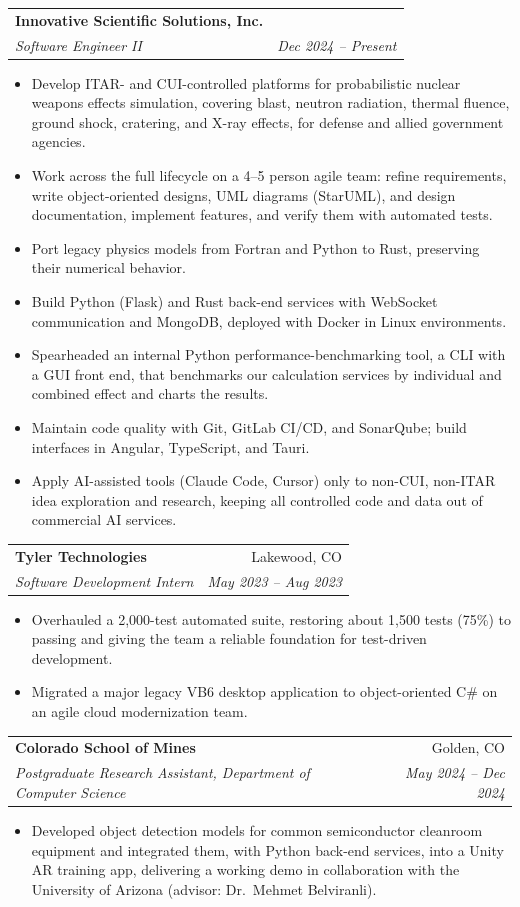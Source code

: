 \documentclass[letterpaper,10pt]{article}
\makeatletter
\newcommand{\entry}[4]{%
  \begin{tabularx}{\linewidth}{@{}X r@{}}
    \textbf{#1} & #2 \\
    \textit{#3} & \textit{\small #4} \\
  \end{tabularx}\vspace{-2pt}%
}
\makeatother
\begin{document}
\entry{Innovative Scientific Solutions, Inc.}{}{Software Engineer II}{Dec 2024 -- Present}
\begin{itemize}
  \item Develop ITAR- and CUI-controlled platforms for probabilistic nuclear weapons effects simulation, covering
        blast, neutron radiation, thermal fluence, ground shock, cratering, and X-ray effects,
        for defense and allied government agencies.
  \item Work across the full lifecycle on a 4--5 person agile team: refine requirements, write object-oriented
        designs, UML diagrams (StarUML), and design documentation, implement features, and verify them with automated tests.
  \item Port legacy physics models from Fortran and Python to Rust, preserving their numerical behavior.
  \item Build Python (Flask) and Rust back-end services with WebSocket communication and MongoDB, deployed
        with Docker in Linux environments.
  \item Spearheaded an internal Python performance-benchmarking tool, a CLI with a GUI front end, that benchmarks
        our calculation services by individual and combined effect and charts the results.
  \item Maintain code quality with Git, GitLab CI/CD, and SonarQube; build interfaces in Angular, TypeScript, and Tauri.
  \item Apply AI-assisted tools (Claude Code, Cursor) only to non-CUI, non-ITAR idea exploration and research,
        keeping all controlled code and data out of commercial AI services.
\end{itemize}

\entry{Tyler Technologies}{Lakewood, CO}{Software Development Intern}{May 2023 -- Aug 2023}
\begin{itemize}
  \item Overhauled a 2,000-test automated suite, restoring about 1,500 tests (75\%) to passing and giving the
        team a reliable foundation for test-driven development.
  \item Migrated a major legacy VB6 desktop application to object-oriented C\# on an agile cloud modernization team.
\end{itemize}

\entry{Colorado School of Mines}{Golden, CO}{Postgraduate Research Assistant, Department of Computer Science}{May 2024 -- Dec 2024}
\begin{itemize}
  \item Developed object detection models for common semiconductor cleanroom equipment and integrated them,
        with Python back-end services, into a Unity AR training app, delivering a working demo in collaboration
        with the University of Arizona (advisor: Dr.\ Mehmet Belviranli).
\end{itemize}
\end{document}
